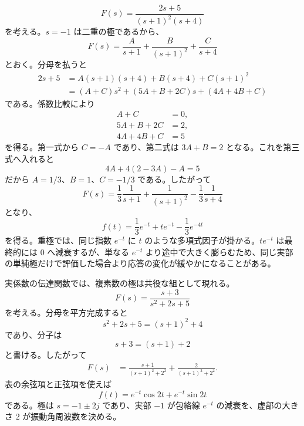 \begin{example}[重根を持つ極]
\begin{equation}
  F(s)=\frac{2s+5}{(s+1)^2(s+4)}
\end{equation}
を考える。$s=-1$ は二重の極であるから、
\begin{equation}
  F(s)=\frac{A}{s+1}+\frac{B}{(s+1)^2}+\frac{C}{s+4}
\end{equation}
とおく。分母を払うと
\begin{align}
  2s+5
  &=A(s+1)(s+4)+B(s+4)+C(s+1)^2\\
  &=(A+C)s^2+(5A+B+2C)s+(4A+4B+C)
\end{align}
である。係数比較により
\begin{align}
  A+C&=0,\\
  5A+B+2C&=2,\\
  4A+4B+C&=5
\end{align}
を得る。第一式から $C=-A$ であり、第二式は $3A+B=2$ となる。これを第三式へ入れると
\begin{equation}
  4A+4(2-3A)-A=5
\end{equation}
だから $A=1/3$、$B=1$、$C=-1/3$ である。したがって
\begin{equation}
  F(s)=\frac{1}{3}\frac{1}{s+1}
       +\frac{1}{(s+1)^2}
       -\frac{1}{3}\frac{1}{s+4}
\end{equation}
となり、
\begin{equation}
  f(t)=\frac{1}{3}e^{-t}+t e^{-t}-\frac{1}{3}e^{-4t}
\end{equation}
を得る。重極では、同じ指数 $e^{-t}$ に $t$ のような多項式因子が掛かる。$t e^{-t}$ は最終的には 0 へ減衰するが、単なる $e^{-t}$ より途中で大きく膨らむため、同じ実部の単純極だけで評価した場合より応答の変化が緩やかになることがある。
\end{example}

\begin{example}[複素共役極]
実係数の伝達関数では、複素数の極は共役な組として現れる。
\begin{equation}
  F(s)=\frac{s+3}{s^2+2s+5}
\end{equation}
を考える。分母を平方完成すると
\begin{equation}
  s^2+2s+5=(s+1)^2+4
\end{equation}
であり、分子は
\begin{equation}
  s+3=(s+1)+2
\end{equation}
と書ける。したがって
\begin{align}
  F(s)
  &=\frac{s+1}{(s+1)^2+2^2}
    +\frac{2}{(s+1)^2+2^2}.
\end{align}
表の余弦項と正弦項を使えば
\begin{equation}
  f(t)=e^{-t}\cos 2t+e^{-t}\sin 2t
\end{equation}
である。極は $s=-1\pm 2j$ であり、実部 $-1$ が包絡線 $e^{-t}$ の減衰を、虚部の大きさ $2$ が振動角周波数を決める。
\end{example}

